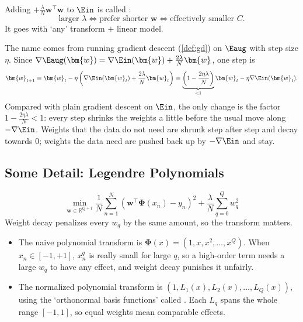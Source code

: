 \begin{definition}\label{def:weight-decay}
    Adding \(+\frac{\lambda}{N} \bm{w}^\top \bm{w}\) to \(\Ein\) is called
    :
    \[
        \text{larger } \lambda \iff \text{prefer shorter } \bm{w} \iff
        \text{effectively smaller } C .
    \]
    It goes with `any' transform \(+\) linear model.
\end{definition}

The name comes from running gradient descent (\autoref{def:gd}) on \(\Eaug\)
with step size \(\eta\). Since \(\nabla \Eaug(\bm{w}) = \nabla \Ein(\bm{w}) +
\frac{2\lambda}{N} \bm{w}\), one step is
\[
    \bm{w}_{t+1} = \bm{w}_t - \eta \left( \nabla \Ein(\bm{w}_t) +
    \frac{2\lambda}{N} \bm{w}_t \right) = \underbrace{\left( 1 -
    \frac{2\eta\lambda}{N} \right)}_{< 1} \bm{w}_t - \eta \nabla
    \Ein(\bm{w}_t) .
\]
Compared with plain gradient descent on \(\Ein\), the only change is the factor
\(1 - \frac{2\eta\lambda}{N} < 1\): every step shrinks the weights a little
before the usual move along \(-\nabla \Ein\). Weights that the data do not need
are shrunk step after step and decay towards \(0\); weights the data need are
pushed back up by \(-\nabla \Ein\) and stay.

\subsection{Some Detail: Legendre Polynomials}

\[
    \min_{\bm{w} \in \mathbb{R}^{Q+1}} \frac{1}{N} \sum_{n=1}^{N} \left(
    \bm{w}^\top \bm{\Phi}(x_n) - y_n \right)^2 + \frac{\lambda}{N}
    \sum_{q=0}^{Q} w_q^2
\]
Weight decay penalizes every \(w_q\) by the same amount, so the transform
matters.
\begin{itemize}
    \item The naive polynomial transform is \(\bm{\Phi}(x) = \left( 1, x, x^2,
        \ldots, x^Q \right)\). When \(x_n \in [-1, +1]\), \(x_n^q\) is really
        small for large \(q\), so a high-order term needs a large \(w_q\) to
        have any effect, and weight decay punishes it unfairly.
    \item The normalized polynomial transform is \(\left( 1, L_1(x), L_2(x),
        \ldots, L_Q(x) \right)\), using the `orthonormal basis functions' called
        . Each \(L_q\) spans the whole range
        \([-1, 1]\), so equal weights mean comparable effects.
\end{itemize}


